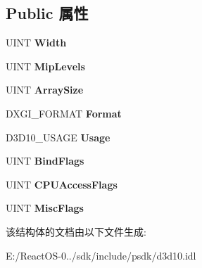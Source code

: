 \subsection*{Public 属性}
\begin{DoxyCompactItemize}
\item 
\mbox{\label{struct_d3_d10___t_e_x_t_u_r_e1_d___d_e_s_c_a1a64057499a3bc53a31cfa0d733a5407}} 
U\+I\+NT {\bfseries Width}
\item 
\mbox{\label{struct_d3_d10___t_e_x_t_u_r_e1_d___d_e_s_c_ac2b748774641594d365d5738998e42f3}} 
U\+I\+NT {\bfseries Mip\+Levels}
\item 
\mbox{\label{struct_d3_d10___t_e_x_t_u_r_e1_d___d_e_s_c_ac2b5ee55d9d4d45f33f500ecfafbf9e1}} 
U\+I\+NT {\bfseries Array\+Size}
\item 
\mbox{\label{struct_d3_d10___t_e_x_t_u_r_e1_d___d_e_s_c_a7bbafc2fc44269712b1db479f6531efc}} 
D\+X\+G\+I\+\_\+\+F\+O\+R\+M\+AT {\bfseries Format}
\item 
\mbox{\label{struct_d3_d10___t_e_x_t_u_r_e1_d___d_e_s_c_a5defecbae5e54dabd8ca3106e744d719}} 
D3\+D10\+\_\+\+U\+S\+A\+GE {\bfseries Usage}
\item 
\mbox{\label{struct_d3_d10___t_e_x_t_u_r_e1_d___d_e_s_c_ac9a4057bda31976b34d66693d9e9daf6}} 
U\+I\+NT {\bfseries Bind\+Flags}
\item 
\mbox{\label{struct_d3_d10___t_e_x_t_u_r_e1_d___d_e_s_c_a2696fdd07e412b397e8407ab48207598}} 
U\+I\+NT {\bfseries C\+P\+U\+Access\+Flags}
\item 
\mbox{\label{struct_d3_d10___t_e_x_t_u_r_e1_d___d_e_s_c_aea43b5925ed85e9f3e126ad5d82279d4}} 
U\+I\+NT {\bfseries Misc\+Flags}
\end{DoxyCompactItemize}


该结构体的文档由以下文件生成\+:\begin{DoxyCompactItemize}
\item 
E\+:/\+React\+O\+S-\/0../sdk/include/psdk/d3d10.\+idl\end{DoxyCompactItemize}
